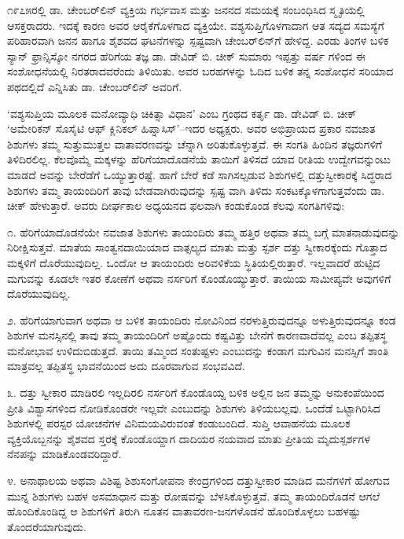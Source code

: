 ೧೯೭೫ರಲ್ಲಿ ಡಾ. ಚೇಂಬರ್​ಲಿನ್ ವ್ಯಕ್ತಿಯ ಗರ್ಭವಾಸ ಮತ್ತು ಜನನದ ಸಮಯಕ್ಕೆ ಸಂಬಂಧಿಸಿದ ಸ್ಮೃತಿಯಲ್ಲಿ ಆಸಕ್ತರಾದರು. ಇದಕ್ಕೆ ಕಾರಣ ಅವರ ಆರೈಕೆಗೊಳಗಾದ ವ್ಯಕ್ತಿಯೇ. ವಶ್ಯಸುಪ್ತಿಗೊಳಗಾದಾಗ ಆತ ಸದ್ಯದ ಸಮಸ್ಯೆಗೆ ಪರಿಹಾರವಾಗಿ ಜನನ ಹಾಗೂ ಶೈಶವದ ಘಟನೆಗಳನ್ನು ಸ್ಪಷ್ಟವಾಗಿ ಚೇಂಬರ್​ಲಿನ್​ಗೆ ಹೇಳಿದ್ದ. ಎರಡು ತಿಂಗಳ ಬಳಿಕ ಸ್ಯಾನ್ ಫ್ರಾನ್ಸಿಸ್ಕೋ ನಗರದ ಹೆರಿಗೆಯ ತಜ್ಞ ಡಾ. ಡೇವಿಡ್ ಬಿ. ಚೀಕ್ ಸುಮಾರು ಇಪ್ಪತ್ತು ವರ್ಷ ಗಳಿಂದ ಈ ಸಂಶೋಧನೆಯಲ್ಲಿ ನಿರತರಾದವರೆಂದು ತಿಳಿಯಿತು. ಅವರ ಬರಹಗಳನ್ನು ಓದಿದ ಬಳಿಕ ತನ್ನ ಸಂಶೋಧನೆ ಸರಿಯಾದ ಪಥದಲ್ಲಿದೆ ಎನ್ನಿಸಿತು ಡಾ. ಚೇಂಬರ್​ಲಿನ್ ಅವರಿಗೆ.

‘ವಶ್ಯಸುಪ್ತಿಯ ಮೂಲಕ ಮನೋವ್ಯಾಧಿ ಚಿಕಿತ್ಸಾ ವಿಧಾನ’ ಎಂಬ ಗ್ರಂಥದ ಕರ್ತೃ ಡಾ. ಡೇವಿಡ್ ಬಿ. ಚೀಕ್ ‘ಅಮೇರಿಕನ್ ಸೊಸೈಟಿ ಆಫ್ ಕ್ಲಿನಿಕಲ್ ಹಿಪ್ನಾಸಿಸ್​’–ಇದರ ಅಧ್ಯಕ್ಷರು. ಅವರ ಅಭಿಪ್ರಾಯದ ಪ್ರಕಾರ ನವಜಾತ ಶಿಶುಗಳು ತಮ್ಮ ಸುತ್ತುಮುತ್ತಲ ವಾತಾವರಣವನ್ನು ಚೆನ್ನಾಗಿ ಅರಿತುಕೊಳ್ಳುತ್ತವೆ. ಈ ಸಂಗತಿ ಹಿಂದಿನ ತಜ್ಞರುಗಳಿಗೆ ತಿಳಿದಿರಲಿಲ್ಲ. ಕೆಲವೊಮ್ಮೆ ಮಕ್ಕಳನ್ನು ಹೆರಿಗೆಯಾದೊಡನೆಯೆ ತಾಯಿಗೆ ತಿಳಿಸದೆ ಯಾವ ರೀತಿಯ ಉದ್ವೇಗವನ್ನುಂಟು ಮಾಡದೆ ಅವನ್ನು ಬೇರೆಡೆಗೆ ಒಯ್ಯುತ್ತಾರಷ್ಟೆ. ಹಾಗೆ ಬೇರೆ ಕಡೆ ಸಾಗಿಸಲ್ಪಡುವ ಶಿಶುಗಳಲ್ಲಿ ದತ್ತುಸ್ವೀಕಾರಕ್ಕೆ ಸಿದ್ಧರಾದ ಶಿಶುಗಳು ತಮ್ಮ ತಾಯಂದಿರಿಗೆ ತಾವು ಬೇಡವಾಗಿರುವುದನ್ನು ಸ್ಪಷ್ಟ ವಾಗಿ ತಿಳಿದು ಸಂಕಟಕ್ಕೊಳಗಾಗುತ್ತವೆಂದು ಡಾ. ಚೀಕ್ ಹೇಳುತ್ತಾರೆ. ಅವರು ದೀರ್ಘಕಾಲ ಅಧ್ಯಯನದ ಫಲವಾಗಿ ಕಂಡುಕೊಂಡ ಕೆಲವು ಸಂಗತಿಗಳಿವು:

೧. ಹೆರಿಗೆಯಾದೊಡನೆಯೇ ನವಜಾತ ಶಿಶುಗಳು ತಾಯಂದಿರು ತಮ್ಮ ಹತ್ತಿರ ಅಥವಾ ತಮ್ಮ ಬಗ್ಗೆ ಮಾತನಾಡುವುದನ್ನು ನಿರೀಕ್ಷಿಸುತ್ತವೆ. ಮಾತೆಯ ಸಾಂತ್ವನದಾಯಿಯಾದ ವಾತ್ಸಲ್ಯದ ಮಾತು ಮತ್ತು ಸ್ಪರ್ಶ ದತ್ತು ಸ್ವೀಕಾರಕ್ಕೆಂದು ಗೊತ್ತಾದ ಮಕ್ಕಳಿಗೆ ದೊರೆಯುವುದಿಲ್ಲ. ಒಂದೋ ಆ ತಾಯಂದಿರು ಅರಿವಳಿಕೆಯ ಸ್ಥಿತಿಯಲ್ಲಿರುತ್ತಾರೆ. ಇಲ್ಲವಾದರೆ ಹುಟ್ಟಿದ ಮಗುವನ್ನು ಕೂಡಲೇ ಇತರ ಕೋಣೆಗೆ ಅಥವಾ ನರ್ಸರಿಗೆ ಕೊಂಡೊಯ್ಯುತ್ತಾರೆ. ತಾಯಿಯ ಸಾಮೀಪ್ಯವೇ ಅವುಗಳಿಗೆ ದೊರೆಯುವುದಿಲ್ಲ.

೨. ಹೆರಿಗೆಯಾಗುವಾಗ ಅಥವಾ ಆ ಬಳಿಕ ತಾಯಂದಿರು ನೋವಿನಿಂದ ನರಳುತ್ತಿರುವುದನ್ನೂ ಅಳುತ್ತಿರುವುದನ್ನೂ ಕಂಡ ಶಿಶುಗಳ ಮನಸ್ಸಿನಲ್ಲಿ ತಾವು ತಮ್ಮ ತಾಯಂದಿರಿಗೆ ಅಷ್ಟೊಂದು ಕಷ್ಟವಿತ್ತು ಬೇನೆಗೆ ಕಾರಣವಾದೆವಲ್ಲ ಎಂಬ ತಪ್ಪಿತಸ್ಥ ಮನೋಭಾವ ಉಳಿದುಬಿಡುತ್ತದೆ. ತಾಯಿ ತಮ್ಮಿಂದ ಸಂತುಷ್ಟಳು ಎಂಬುದನ್ನು ಕಂಡಾಗ ಮಗುವಿನ ಮನಸ್ಸಿಗೆ ಶಾಂತಿ ಮಾತ್ರವಲ್ಲ ತಪ್ಪಿತಸ್ಥ ಭಾವನೆಯಿಂದ ಅದು ದೂರವಾಗುವ ಸಂಭವವಿದೆ.

೩. ದತ್ತು ಸ್ವೀಕಾರ ಮಾಡಿರಲಿ ಇಲ್ಲದಿರಲಿ ನರ್ಸರಿಗೆ ಕೊಂಡೊಯ್ದ ಬಳಿಕ ಅಲ್ಲಿನ ಜನ ತಮ್ಮನ್ನು ಅನುಕಂಪೆಯಿಂದ ಪ್ರೀತಿ ವಿಶ್ವಾಸಗಳಿಂದ ನೋಡಿಕೊಂಡರೇ ಇಲ್ಲವೇ ಎಂಬುದನ್ನು ಶಿಶುಗಳು ತಿಳಿಯಬಲ್ಲವು. ಒಂದೆಡೆ ಒಟ್ಟಾಗಿರಿಸಿದ ಶಿಶುಗಳಲ್ಲಿ ಪರಸ್ಪರ ಯೋಚನೆಗಳ ವಿನಿಮಯವಿರುವಂತೆ ಕಂಡುಬಂದಿದೆ. ಸುಪ್ತಿ ಆವಾಹನೆಯ ಮೂಲಕ ವ್ಯಕ್ತಿಯೊಬ್ಬನನ್ನು ಶೈಶವದ ಸ್ತರಕ್ಕೆ ಕೊಂಡೊಯ್ದಾಗ ದಾದಿಯರ ನಯವಾದ ಮಾತು ಪ್ರೀತಿಯ ಮೃದುಸ್ಪರ್ಶಗಳ ನೆನಪನ್ನು ಮಾಡಿಕೊಂಡವರಿದ್ದಾರೆ.

೪. ಅನಾಥಾಲಯ ಅಥವಾ ವಿಶಿಷ್ಟ ಶಿಶುಸಂಗೋಪನಾ ಕೇಂದ್ರಗಳಿಂದ ದತ್ತುಸ್ವೀಕಾರ ಮಾಡಿದ ಮನೆಗಳಿಗೆ ಹೋಗುವ ಮುನ್ನ ಶಿಶುಗಳು ಬಹಳ ಅಸಮಾಧಾನ ಮತ್ತು ರೋಷವನ್ನು ಬೆಳಸಿಕೊಳ್ಳುತ್ತವೆ. ತಮ್ಮ ತಾಯಂದಿರೊಡನೆ ಆಗಲೆ ಹೊಂದಿಕೊಂಡಿದ್ದ ಆ ಶಿಶುಗಳಿಗೆ ತಿರುಗಿ ನೂತನ ವಾತಾವರಣ-ಜನಗಳೊಡನೆ ಹೊಂದಿಕೊಳ್ಳಲು ಬಹಳಷ್ಟು ತೊಂದರೆಯಾಗುವುದು.

